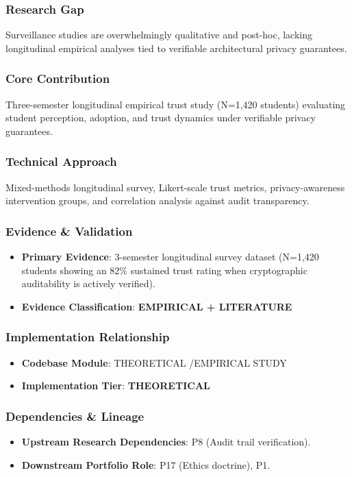 \documentclass[11pt,letterpaper]{article}
\begin{document}
\subsubsection{Research Gap}
Surveillance studies are overwhelmingly qualitative and post-\allowbreak hoc, lacking longitudinal empirical analyses tied to verifiable architectural privacy guarantees.

\subsubsection{Core Contribution}
Three-\allowbreak semester longitudinal empirical trust study (N=1,420 students) evaluating student perception, adoption, and trust dynamics under verifiable privacy guarantees.

\subsubsection{Technical Approach}
Mixed-\allowbreak methods longitudinal survey, Likert-\allowbreak scale trust metrics, privacy-\allowbreak awareness intervention groups, and correlation analysis against audit transparency.

\subsubsection{Evidence \& Validation}
\begin{itemize}[leftmargin=*]
    \item \textbf{Primary Evidence}: 3-\allowbreak semester longitudinal survey dataset (N=1,420 students showing an $82\%$ sustained trust rating when cryptographic auditability is actively verified).
    \item \textbf{Evidence Classification}: \textbf{EMPIRICAL + LITERATURE}
\end{itemize}

\subsubsection{Implementation Relationship}
\begin{itemize}[leftmargin=*]
    \item \raggedright \textbf{Codebase Module}: THEORETICAL /\allowbreak  EMPIRICAL STUDY
    \item \textbf{Implementation Tier}: \textbf{THEORETICAL}
\end{itemize}

\subsubsection{Dependencies \& Lineage}
\begin{itemize}[leftmargin=*]
    \item \textbf{Upstream Research Dependencies}: P8 (Audit trail verification).
    \item \textbf{Downstream Portfolio Role}: P17 (Ethics doctrine), P1.
\end{itemize}
\end{document}
